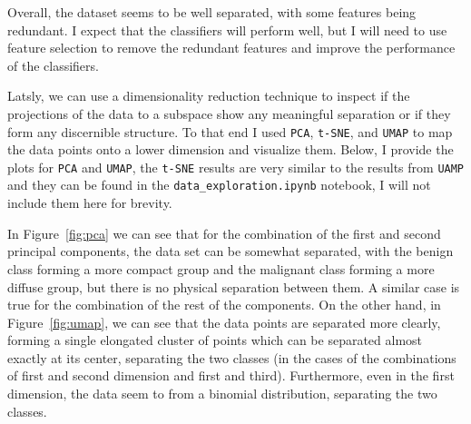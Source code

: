 \documentclass[12pt]{article}
\begin{document}
Overall, the dataset seems to be well separated, with some features being
redundant. I expect that the classifiers will perform well, but I will need to
use feature selection to remove the redundant features and improve the
performance of the classifiers.

Latsly, we can use a dimensionality reduction technique to inspect if the
projections of the data to a subspace show any meaningful separation or if they
form any discernible structure. To that end I used \texttt{PCA}, \texttt{t-SNE},
and \texttt{UMAP} to map the data points onto a lower dimension and visualize
them. Below, I provide the plots for \texttt{PCA} and \texttt{UMAP}, the
\texttt{t-SNE} results are very similar to the results from \texttt{UAMP} and
they can be found in the \texttt{data\_exploration.ipynb} notebook, I will not
include them here for brevity.

In Figure~\ref{fig:pca} we can see that for the combination of the first and
second principal components, the data set can be somewhat separated, with the
benign class forming a more compact group and the malignant class forming a more
diffuse group, but there is no physical separation between them. A similar
case is true for the combination of the rest of the components. On the other
hand, in Figure~\ref{fig:umap}, we can see that the data points are separated
more clearly, forming a single elongated cluster of points which can be
separated almost exactly at its center, separating the two classes (in the
cases of the combinations of first and second dimension and first and third).
Furthermore, even in the first dimension, the data seem to from a binomial
distribution, separating the two classes.
\end{document}
